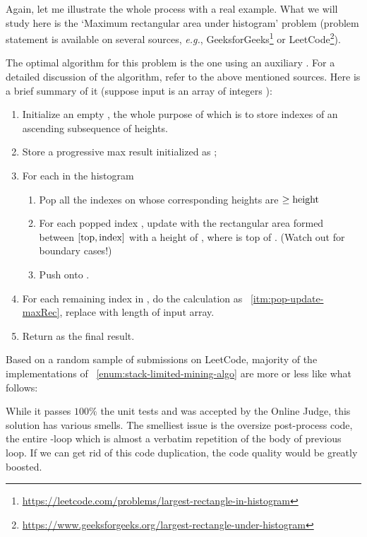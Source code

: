 Again, let me illustrate the whole process with a real example.
What we will study here is the `Maximum rectangular area under
histogram' problem (problem statement is available on several sources, \textit{e.g.},
GeeksforGeeks\footnote{\url{https://leetcode.com/problems/largest-rectangle-in-histogram}}
or LeetCode\footnote{\url{https://www.geeksforgeeks.org/largest-rectangle-under-histogram}}).

The optimal algorithm for this problem is the one using an auxiliary .
For a detailed discussion of the algorithm, refer to the above mentioned sources.
Here is a brief summary of it (suppose input is an array of integers ):
\begin{alisting}[H]
    \caption{\label{enum:stack-limited-mining-algo}Stack-based algorithm for
    the `maximum rectangular area under histogram' problem}
    \begin{enumerate}
        \item Initialize an empty , the whole purpose of
        which is to store indexes of an ascending subsequence of heights.
        \item Store a progressive max result initialized as ;
        \item For each  in the histogram
        \begin{enumerate}
            \item Pop all the indexes on  whose corresponding heights are
            $\geq \mbox{\code{height}}$
            \item For each popped index , update  with the
            rectangular area formed between $[\mbox{\code{top}}, \mbox{\code{index}}]$
            with a height of , where  is top of .
            (Watch out for boundary cases!) \label{itm:pop-update-maxRec}
            \item Push  onto .
        \end{enumerate}
        \item For each remaining index in , do the calculation
        as ~\ref{itm:pop-update-maxRec}, replace  with length of input array.
        \item Return  as the final result.
    \end{enumerate}
\end{alisting}


Based on a random sample of submissions on LeetCode, majority of the implementations
of ~\autoref{enum:stack-limited-mining-algo} are more or less like what follows:

While it passes $100\%$ the unit tests and was accepted by the Online Judge, this
solution has various smells.
The smelliest issue is the oversize post-process code, the entire -loop which
is almost a verbatim repetition of the body of previous loop.
If we can get rid of this code duplication, the code quality would be greatly boosted.


